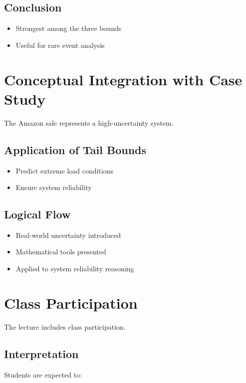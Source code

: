 \documentclass[12pt]{article}
\begin{document}
\subsection{Conclusion}

\begin{itemize}
\item Strongest among the three bounds
\item Useful for rare event analysis
\end{itemize}

\section{Conceptual Integration with Case Study}

The Amazon sale represents a high-uncertainty system.

\subsection{Application of Tail Bounds}

\begin{itemize}
\item Predict extreme load conditions
\item Ensure system reliability
\end{itemize}

\subsection{Logical Flow}

\begin{itemize}
\item Real-world uncertainty introduced
\item Mathematical tools presented
\item Applied to system reliability reasoning
\end{itemize}

\section{Class Participation}

The lecture includes class participation.

\subsection{Interpretation}

Students are expected to:
\end{document}

